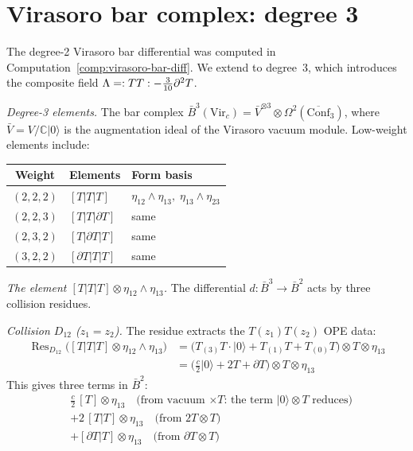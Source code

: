 \section{Virasoro bar complex: degree 3}
\label{sec:virasoro-degree3-details}

The degree-2 Virasoro bar differential was computed in
Computation~\ref{comp:virasoro-bar-diff}.  We extend to degree~3,
which introduces the composite field $\Lambda = :{TT}: -
\frac{3}{10}\partial^2 T$.

\begin{computation}
\label{comp:virasoro-degree3}

\emph{Degree-3 elements.}
The bar complex $\bar{B}^3(\mathrm{Vir}_c) = \bar{V}^{\otimes 3}
\otimes \Omega^2(\overline{\mathrm{Conf}}_3)$, where
$\bar{V} = V/\mathbb{C}|0\rangle$ is the augmentation ideal
of the Virasoro vacuum module.  Low-weight elements include:
\begin{center}
\renewcommand{\arraystretch}{1.2}
\begin{tabular}{cll}
\textbf{Weight} & \textbf{Elements} & \textbf{Form basis} \\
\hline
$(2,2,2)$ & $[T|T|T]$ & $\eta_{12}\wedge\eta_{13},\;\eta_{13}\wedge\eta_{23}$ \\
$(2,2,3)$ & $[T|T|\partial T]$ & same \\
$(2,3,2)$ & $[T|\partial T|T]$ & same \\
$(3,2,2)$ & $[\partial T|T|T]$ & same
\end{tabular}
\end{center}

\emph{The element $[T|T|T] \otimes \eta_{12}\wedge\eta_{13}$.}
The differential $d\colon \bar{B}^3 \to \bar{B}^2$ acts by three
collision residues.

\emph{Collision $D_{12}$ ($z_1 = z_2$).}
The residue extracts the $T(z_1)T(z_2)$ OPE data:
\begin{align*}
\operatorname{Res}_{D_{12}}\bigl([T|T|T] \otimes \eta_{12}\wedge\eta_{13}\bigr)
&= \bigl(T_{(3)}T \cdot |0\rangle + T_{(1)}T + T_{(0)}T\bigr) \otimes T
\otimes \eta_{13} \\
&= \bigl(\tfrac{c}{2}|0\rangle + 2T + \partial T\bigr)
\otimes T \otimes \eta_{13}
\end{align*}
This gives three terms in $\bar{B}^2$:
\begin{align*}
&\frac{c}{2}\,[T] \otimes \eta_{13}
\quad\text{(from vacuum $\times T$: the term $|0\rangle \otimes T$ reduces)} \\
&+ 2\,[T|T] \otimes \eta_{13}
\quad\text{(from $2T \otimes T$)} \\
&+ [\partial T|T] \otimes \eta_{13}
\quad\text{(from $\partial T \otimes T$)}
\end{align*}


\end{computation}
